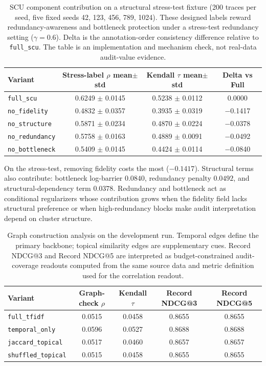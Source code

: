 \documentclass[pdflatex,sn-mathphys-num,iicol]{sn-jnl}
\begin{document}
\begin{table}[ht]
\caption{SCU component contribution on a structural stress-test fixture (200 traces per seed, five fixed seeds 42, 123, 456, 789, 1024). These designed labels reward redundancy-awareness and bottleneck protection under a stress-test redundancy setting ($\gamma=0.6$). Delta is the annotation-order consistency difference relative to \texttt{full\_scu}. The table is an implementation and mechanism check, not real-data audit-value evidence.}
\label{tab:scu-stress-test}
\centering
\small
\renewcommand{\arraystretch}{1.08}
\begin{tabular}{lccc}
\toprule
\textbf{Variant} & \textbf{Stress-label $\rho$ mean$\pm$std} & \textbf{Kendall $\tau$ mean$\pm$std} & \textbf{Delta vs Full} \\
\midrule
\texttt{full\_scu} & 0.6249 $\pm$ 0.0145 & 0.5238 $\pm$ 0.0112 & 0.0000 \\
\texttt{no\_fidelity} & 0.4832 $\pm$ 0.0357 & 0.3935 $\pm$ 0.0319 & $-$0.1417 \\
\texttt{no\_structure} & 0.5871 $\pm$ 0.0234 & 0.4870 $\pm$ 0.0224 & $-$0.0378 \\
\texttt{no\_redundancy} & 0.5758 $\pm$ 0.0163 & 0.4889 $\pm$ 0.0091 & $-$0.0492 \\
\texttt{no\_bottleneck} & 0.5409 $\pm$ 0.0145 & 0.4424 $\pm$ 0.0114 & $-$0.0840 \\
\bottomrule
\end{tabular}
\end{table}

On the stress-test, removing fidelity costs the most ($-0.1417$). Structural terms also contribute: bottleneck log-barrier $0.0840$, redundancy penalty $0.0492$, and structural-dependency term $0.0378$. Redundancy and bottleneck act as conditional regularizers whose contribution grows when the fidelity field lacks structural preference or when high-redundancy blocks make audit interpretation depend on cluster structure.

\begin{table}[t]
\caption{Graph construction analysis on the development run. Temporal edges define the primary backbone; topical similarity edges are supplementary cues. Record NDCG@3 and Record NDCG@5 are interpreted as budget-constrained audit-coverage readouts computed from the same source data and metric definition used for the correlation readout.}
\label{tab:graph-construction-analysis}
\centering
\small
\renewcommand{\arraystretch}{1.08}
\begin{tabular}{lcccc}
\toprule
\textbf{Variant} & \textbf{Graph-check $\rho$} & \textbf{Kendall $\tau$} & \textbf{Record NDCG@3} & \textbf{Record NDCG@5} \\
\midrule
\texttt{full\_tfidf} & 0.0515 & 0.0458 & 0.8655 & 0.8655 \\
\texttt{temporal\_only} & 0.0596 & 0.0527 & 0.8688 & 0.8688 \\
\texttt{jaccard\_topical} & 0.0517 & 0.0460 & 0.8657 & 0.8657 \\
\texttt{shuffled\_topical} & 0.0515 & 0.0458 & 0.8655 & 0.8655 \\
\bottomrule
\end{tabular}
\end{table}
\end{document}
